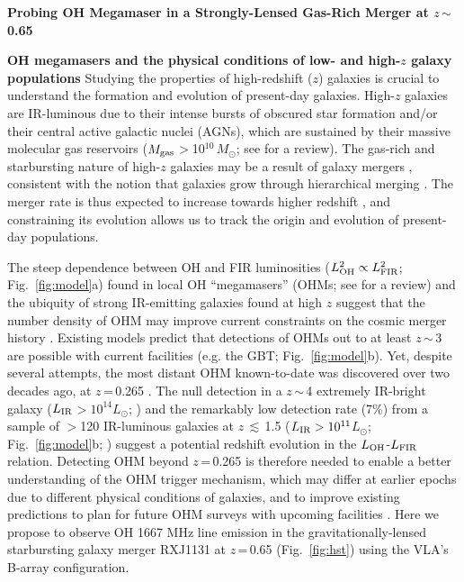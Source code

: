 \documentclass[letterpaper,11pt]{article}
\newcommand{\Lsun}{\mbox{$L_{\odot}$}\xspace}
\newcommand{\Msun}{\mbox{$M_{\odot}$}\xspace}
\newcommand{\LIR}{\mbox{$L_{\rm IR}$}\xspace}
\newcommand{\LFIR}{\mbox{$L_{\rm FIR}$}\xspace}
\newcommand{\LOH}{$L_{\rm OH}$\xspace}
\newcommand{\Fig}[1]{Fig.~\ref{fig:#1}}
\newcommand{\eq}{\,=\,}
\newcommand{\ssim}{\,$\sim$\,}
\newcommand{\galpop}{galaxy populations\xspace}
\begin{document}
\pagestyle{plain}



\begin{center}
{\large{\bf{Probing OH Megamaser in a Strongly-Lensed Gas-Rich Merger at $z$\ssim0.65}}}
\end{center}
\vspace{-.8em}
\textbf{OH megamasers and the physical conditions of low- and high-$z$ \galpop}
Studying the properties of high-redshift ($z$) galaxies is crucial to understand the formation and evolution of present-day galaxies.
High-$z$ galaxies are IR-luminous due to their intense bursts 
of obscured star formation and/or their central active galactic nuclei (AGNs),
which are sustained by their massive molecular gas reservoirs ($M_{\rm gas}$$>$10$^{10}$\,\Msun; see \citet{CW13} for a review).
The gas-rich and starbursting nature of high-$z$ galaxies may be a result of galaxy mergers
\citep{Riechers11a, Hayward12a, Riechers13b}, 
consistent with the notion that galaxies grow through hierarchical merging \citep{White91a}.
The merger rate is thus expected to increase towards higher redshift \citep[e.g.,][]{LeFloch05a, Magnelli09a}, and constraining 
its evolution allows us to track the origin and evolution of present-day populations. %

\noindent The steep dependence between OH and FIR luminosities ($L_{\rm OH}^2\propto L_{\rm FIR}^2$; \Fig{model}a) 
found in local OH ``megamasers'' (OHMs;  see \citealt[]{Lo05a} for a review) and 
the ubiquity of strong IR-emitting galaxies found at high $z$ suggest that
the number density of OHM may improve current constraints on
the cosmic merger history \citep[hereafter DG02]{Darling02b_LF}.
Existing models predict that detections of  
OHMs out to at least $z$\ssim3 are possible with current facilities (e.g. the GBT; \Fig{model}b).
Yet, despite several attempts, 
the most distant OHM known-to-date was discovered over two decades ago, at $z$\eq0.265 \citep{Baan92a}.
The null detection in a $z$\ssim4 extremely IR-bright galaxy (\LIR$>10^{14}$\Lsun; \citealt{Ivison06a}) and 
the remarkably low detection rate (7\%) from a sample of $>$120 IR-luminous galaxies 
at $z$\,$\lesssim$\,1.5 ($L_{\rm IR}>10^{11}$\Lsun; \Fig{model}b; \citealt{Willett12a}) 
suggest a potential redshift evolution in the \LOH-\LFIR relation.
Detecting OHM beyond $z$\eq0.265 is therefore needed to enable a better understanding of the 
OHM trigger mechanism, which may differ at earlier epochs due to different physical conditions of galaxies,
and to improve existing predictions to plan for future OHM surveys with upcoming facilities 
\citep[e.g., FAST, APERTIF/WSRT, ASKAP;][]{Zhang14b}.
Here we propose to observe OH 1667 MHz line emission in the 
gravitationally-lensed starbursting galaxy merger
RXJ1131 at $z$\eq0.65 (\Fig{hst}) using the VLA's B-array configuration. 
\end{document}
